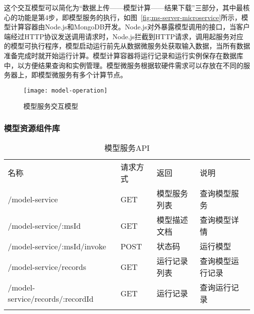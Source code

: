 这个交互模型可以简化为“数据上传——模型计算——结果下载”三部分，其中最核心的功能是第4步，即模型服务的执行，如图~\ref{fig:ms-server-microservice}所示，模型计算容器由Node.js和MongoDB开发。Node.js对外暴露模型调用的接口，当客户端经过HTTP协议发送调用请求时，Node.js拦截到HTTP请求，调用起服务对应的模型可执行程序，模型启动运行前先从数据微服务处获取输入数据，当所有数据准备完成时就开始运行计算。模型计算容器将运行记录和运行实例保存在数据库中，以方便结果查询和实例管理。模型微服务根据软硬件需求可以存放在不同的服务器上，即模型微服务有多个计算节点。

\begin{figure}[!htbp]
    \centering
    \texttt{[image: model-operation]}
    \caption{模型服务交互模型}
    \label{fig:model-operation}
\end{figure}

\subsubsection{模型资源组件库}

\begin{table}[!htbp]
    \centering
    \caption{模型服务API}
    \label{tab:model-service-API}
    \begin{tabular}{llll}
        \Xhline{1.5pt}
        名称 & 请求方式 & 返回 & 说明 \\
        \Xhline{1.5pt}
        /model-service & GET & 模型服务列表 & 查询模型服务 \\
        /model-service/:msId & GET & 模型描述文档 & 查询模型详情 \\
        /model-service/:msId/invoke & POST & 状态码 & 运行模型 \\ 
        /model-service/records & GET & 运行记录列表 & 查询模型运行记录 \\
        /model-service/records/:recordId & GET & 运行记录 & 查询运行记录 \\
        \Xhline{1.5pt}
    \end{tabular}
\end{table}

